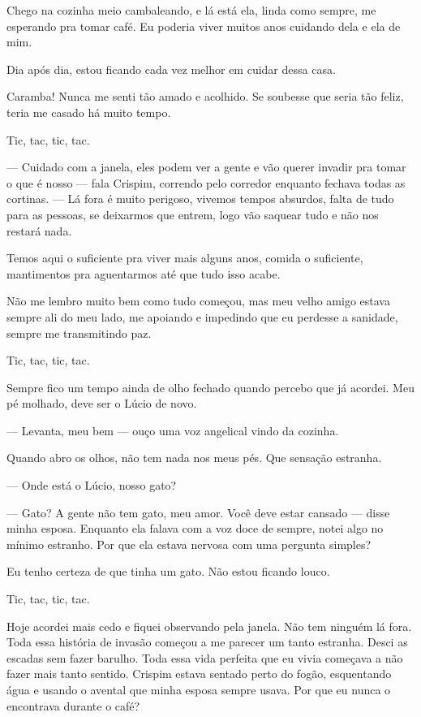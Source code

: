 Chego na cozinha meio cambaleando, e lá está ela, linda como sempre, me esperando pra tomar café. Eu poderia viver muitos anos cuidando dela e ela de mim.

Dia após dia, estou ficando cada vez melhor em cuidar dessa casa.

Caramba! Nunca me senti tão amado e acolhido. Se soubesse que seria tão feliz, teria me casado há muito tempo.

Tic, tac, tic, tac.

— Cuidado com a janela, eles podem ver a gente e vão querer invadir pra tomar o que é nosso — fala Crispim, correndo pelo corredor enquanto fechava todas as cortinas. — Lá fora é muito perigoso, vivemos tempos absurdos, falta de tudo para as pessoas, se deixarmos que entrem, logo vão saquear tudo e não nos restará nada.

Temos aqui o suficiente pra viver mais alguns anos, comida o suficiente, mantimentos pra aguentarmos até que tudo isso acabe.

Não me lembro muito bem como tudo começou, mas meu velho amigo estava sempre ali do meu lado, me apoiando e impedindo que eu perdesse a sanidade, sempre me transmitindo paz.

Tic, tac, tic, tac.

Sempre fico um tempo ainda de olho fechado quando percebo que já acordei. Meu pé molhado, deve ser o Lúcio de novo.

— Levanta, meu bem — ouço uma voz angelical vindo da cozinha.

Quando abro os olhos, não tem nada nos meus pés. Que sensação estranha.

— Onde está o Lúcio, nosso gato?

— Gato? A gente não tem gato, meu amor. Você deve estar cansado — disse minha esposa. Enquanto ela falava com a voz doce de sempre, notei algo no mínimo estranho. Por que ela estava nervosa com uma pergunta simples?

Eu tenho certeza de que tinha um gato. Não estou ficando louco.

Tic, tac, tic, tac.

Hoje acordei mais cedo e fiquei observando pela janela. Não tem ninguém lá fora. Toda essa história de invasão começou a me parecer um tanto estranha. Desci as escadas sem fazer barulho. Toda essa vida perfeita que eu vivia começava a não fazer mais tanto sentido. Crispim estava sentado perto do fogão, esquentando água e usando o avental que minha esposa sempre usava. Por que eu nunca o encontrava durante o café?

